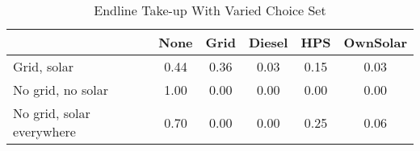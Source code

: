 \begin{table}[htbp]\centering
\caption{Endline Take-up With Varied Choice Set\label {tab1}}
\begin{tabular}{l*{5}{c}}
\toprule
            &        None&        Grid&      Diesel&         HPS&    OwnSolar\\
\midrule
Grid, solar &        0.44&        0.36&        0.03&        0.15&        0.03\\
No grid, no solar&        1.00&        0.00&        0.00&        0.00&        0.00\\
No grid, solar everywhere&        0.70&        0.00&        0.00&        0.25&        0.06\\
\bottomrule
\end{tabular}
\end{table}
